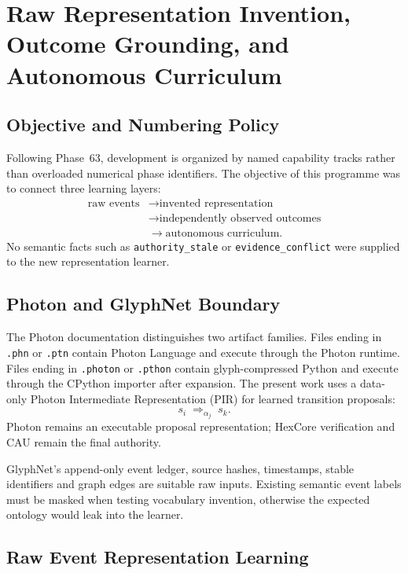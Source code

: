 \section{Raw Representation Invention, Outcome Grounding, and Autonomous Curriculum}
\label{sec:aion-raw-representation-outcome-curriculum}

\subsection{Objective and Numbering Policy}

Following Phase~63, development is organized by named capability tracks rather
than overloaded numerical phase identifiers.  The objective of this programme
was to connect three learning layers:
\[
\begin{aligned}
\text{raw events}
&\rightarrow \text{invented representation}\\
&\rightarrow \text{independently observed outcomes}\\
&\rightarrow \text{autonomous curriculum}.
\end{aligned}
\]
No semantic facts such as \texttt{authority\_stale} or
\texttt{evidence\_conflict} were supplied to the new representation learner.

\subsection{Photon and GlyphNet Boundary}

The Photon documentation distinguishes two artifact families.  Files ending in
\texttt{.phn} or \texttt{.ptn} contain Photon Language and execute through the
Photon runtime.  Files ending in \texttt{.photon} or \texttt{.pthon} contain
glyph-compressed Python and execute through the CPython importer after
expansion.  The present work uses a data-only Photon Intermediate
Representation (PIR) for learned transition proposals:
\[
s_i \;\Rightarrow_{\alpha_j}\; s_k.
\]
Photon remains an executable proposal representation; HexCore verification and
CAU remain the final authority.

GlyphNet's append-only event ledger, source hashes, timestamps, stable
identifiers and graph edges are suitable raw inputs.  Existing semantic event
labels must be masked when testing vocabulary invention, otherwise the expected
ontology would leak into the learner.

\subsection{Raw Event Representation Learning}

